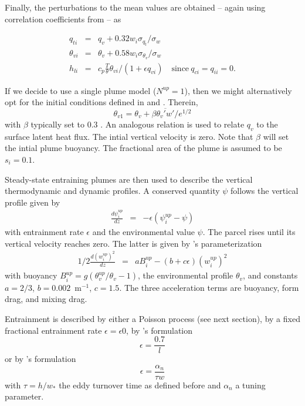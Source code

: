 \documentclass[dvipdfmx,a4paper,10pt]{article}
\begin{document}
Finally, the perturbations to the mean values are obtained -- again using correlation coefficients from \cite{cheinet03a} -- as 

\begin{eqnarray}
 q_{ti}&=&q_{v}+0.32 w_i  \sigma_{q_t}/\sigma_w\\
 \theta_{vi}&=&\theta_{v}+0.58 w_i  \sigma_{\theta_v}/\sigma_w\\
  h_{li}&=& c_p\frac{T}{\theta} \theta_{vi}/(1+\epsilon q_{vi}) \quad\mathrm{since}~q_{ci}=q_{ii}=0.
\end{eqnarray}


If we decide to use a single plume model ($N^{up}=1$), then we might alternatively opt for the initial conditions defined in \cite{soares04} and \cite{witek11}. Therein, 
\begin{equation}
 \theta_{v1} =  \theta_{v}+\beta \overline{\theta_v'w'}/e^{1/2}
\end{equation}
with $\beta$ typically set to 0.3 \citep{soares04,witek11}. An analogous relation is used to relate $q_v$ to the surface latent heat flux. The intial vertical velocity is zero. Note that $\beta$ will set the intial plume buoyancy. The fractional area of the plume is assumed to be $s_i=0.1$.

Steady-state entraining plumes are then used to describe the vertical thermodynamic and dynamic profiles. A conserved quantity $\psi$ follows the vertical profile given by
\begin{eqnarray}\label{eqn:conserved}
 \frac{d\psi_i^{up} }{d z } &=& - \epsilon(\psi_i^{up} - \psi)
\end{eqnarray}
with entrainment rate $\epsilon$ and the environmental value $\psi$. The parcel rises until its vertical velocity reaches zero. The latter is given by \cite{simpson69a}'s parameterization
\begin{eqnarray}\label{eqn:w}
 1/2\frac{d (w_i^{up})^2 }{d z } &=& aB^{up}_i- (b+c\epsilon)(w_i^{up})^2
\end{eqnarray}
with buoyancy $B_i^{up}=g(\theta_v^{up}/\theta_v-1)$, the environmental profile $\theta_v$, and constants  $a=2/3$, $b=0.002$~m$^{-1}$, $c=1.5$. The three acceleration terms are buoyancy, form drag, and mixing drag. 

Entrainment is described by either a Poisson process (see next section), by a fixed fractional entrainment rate $\epsilon=\epsilon0$, by \cite{witek11}'s formulation
\begin{equation}
 \epsilon=\frac{0.7}{l}
\end{equation}
or by \cite{neggers02}'s formulation
\begin{equation}
 \epsilon=\frac{\alpha_n}{\tau w}
\end{equation}
with $\tau=h/w_*$ the eddy turnover time as defined before and $\alpha_n$ a tuning parameter.
\end{document}
